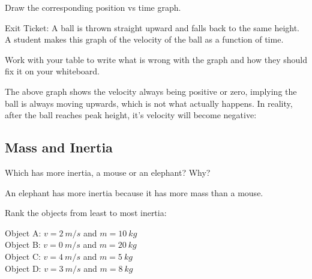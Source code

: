 \documentclass[answers]{exam}
\begin{document}
\begin{questions}
Draw the corresponding position vs time graph.



\question 
Exit Ticket: A ball is thrown straight upward and falls back to the same height. A student makes this graph of the velocity of the ball as a function of time. 

\begin{center}
\end{center}

Work with your table to write what is wrong with the graph and how they should fix it on your whiteboard.

\begin{solution}
    The above graph shows the velocity always being positive or zero, implying the ball is always moving upwards, which is not what actually happens. In reality, after the ball reaches peak height, it's velocity will become negative:

    \begin{center}
    \end{center}    
\end{solution}

\clearpage
\begin{EnvUplevel}
    \subsection{Mass and Inertia}
\end{EnvUplevel}

\question
Which has more inertia, a mouse or an elephant? Why?

\begin{solution}
    An elephant has more inertia because it has more mass than a mouse.
\end{solution}

\question
Rank the objects from least to most inertia:

Object A: $v = \SI{2}{m/s}$ and $m = \SI{10}{kg}$\\
Object B: $v = \SI{0}{m/s}$ and $m = \SI{20}{kg}$\\
Object C: $v = \SI{4}{m/s}$ and $m = \SI{5}{kg}$\\
Object D: $v = \SI{3}{m/s}$ and $m = \SI{8}{kg}$


\end{questions}
\end{document}
